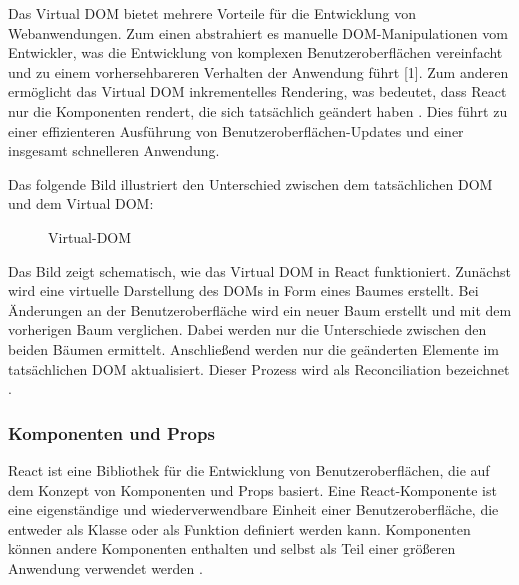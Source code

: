 Das Virtual DOM bietet mehrere Vorteile für die Entwicklung von Webanwendungen. Zum einen abstrahiert es manuelle DOM-Manipulationen vom Entwickler, was die Entwicklung von komplexen Benutzeroberflächen vereinfacht und zu einem vorhersehbareren Verhalten der Anwendung führt [1]. Zum anderen ermöglicht das Virtual DOM inkrementelles Rendering, was bedeutet, dass React nur die Komponenten rendert, die sich tatsächlich geändert haben \cite{ReactWikipedia}. Dies führt zu einer effizienteren Ausführung von Benutzeroberflächen-Updates und einer insgesamt schnelleren Anwendung.

Das folgende Bild illustriert den Unterschied zwischen dem tatsächlichen DOM und dem Virtual DOM:


\begin{figure}[htbp]
	\centering
	\caption{Virtual-DOM}
\end{figure}
Das Bild zeigt schematisch, wie das Virtual DOM in React funktioniert. Zunächst wird eine virtuelle Darstellung des DOMs in Form eines Baumes erstellt. Bei Änderungen an der Benutzeroberfläche wird ein neuer Baum erstellt und mit dem vorherigen Baum verglichen. Dabei werden nur die Unterschiede zwischen den beiden Bäumen ermittelt. Anschließend werden nur die geänderten Elemente im tatsächlichen DOM aktualisiert. Dieser Prozess wird als Reconciliation bezeichnet \cite{ReactVirtualDOM}.

\subsubsection{Komponenten und Props}
React ist eine Bibliothek für die Entwicklung von Benutzeroberflächen, die auf dem Konzept von Komponenten und Props basiert. Eine React-Komponente ist eine eigenständige und wiederverwendbare Einheit einer Benutzeroberfläche, die entweder als Klasse oder als Funktion definiert werden kann. Komponenten können andere Komponenten enthalten und selbst als Teil einer größeren Anwendung verwendet werden \cite{ReactComponentsAndProps}.

